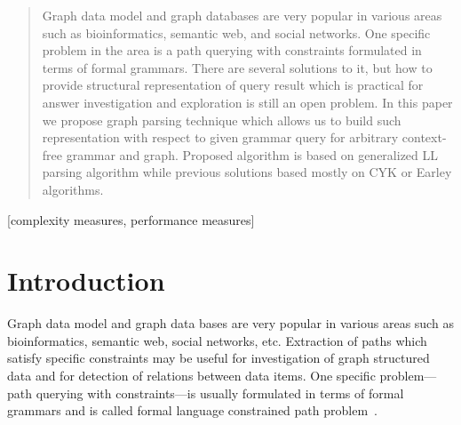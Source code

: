 \documentclass{sig-alternate} %
\begin{document}
\maketitle

\begin{abstract}
Graph data model and graph databases are very popular in various areas such as bioinformatics, semantic web, and social networks. 
One specific problem in the area is a path querying with constraints 
formulated in terms of formal grammars. There are several solutions to it, but
how to provide structural representation of query result which is practical for 
answer investigation and exploration is still an open problem. 
In this paper we propose graph parsing technique which allows us to build such representation with respect to given grammar query for arbitrary context-free grammar and graph.
Proposed algorithm is based on generalized LL parsing algorithm while previous solutions based mostly on CYK or Earley algorithms.

\end{abstract}


[complexity measures, performance measures]



\section{Introduction}
Graph data model and graph data bases are very popular in various areas such as bioinformatics, semantic web, social networks, etc.
Extraction of paths which satisfy specific constraints may be useful for investigation of graph structured data and for detection of relations between data items.
One specific problem---path querying with constraints---is usually formulated in terms of formal grammars and is called formal language constrained path problem~\cite{FLCpathProblem}.

\end{document}
